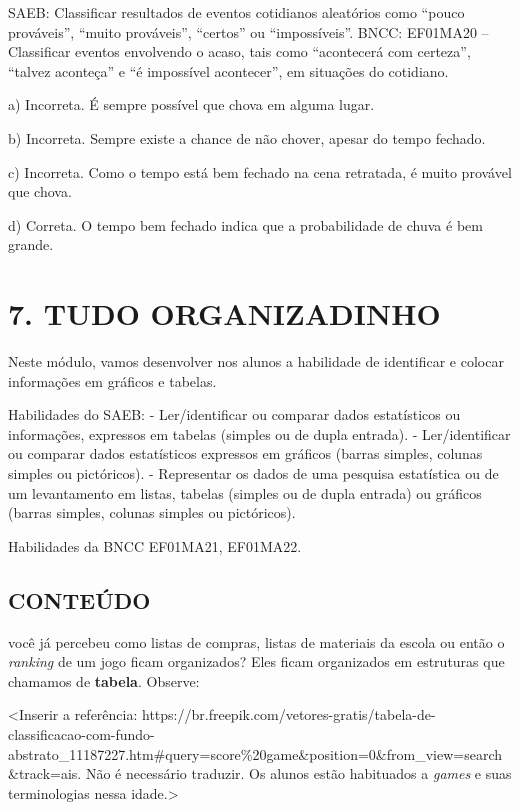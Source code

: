 SAEB: Classificar
resultados de eventos cotidianos aleatórios como ``pouco prováveis'',
``muito prováveis'', ``certos'' ou ``impossíveis''.
BNCC: EF01MA20 -- Classificar eventos envolvendo o acaso, tais como
``acontecerá com certeza'', ``talvez aconteça'' e ``é impossível
acontecer'', em situações do cotidiano.

a) Incorreta. É sempre possível que chova em alguma lugar.

b) Incorreta. Sempre existe a chance de não chover, apesar do tempo fechado.

c) Incorreta. Como o tempo está bem fechado na cena retratada, é muito provável que chova.

d) Correta. O tempo bem fechado indica que a probabilidade de chuva é bem grande.

\section{7. TUDO
ORGANIZADINHO}\label{muxf3dulo-7-tudo-organizadinho}

Neste módulo, vamos desenvolver nos alunos a habilidade de identificar e
colocar informações em gráficos e tabelas.

Habilidades do SAEB:
- Ler/identificar ou comparar dados estatísticos ou informações,
expressos em tabelas (simples ou de dupla entrada).
- Ler/identificar ou comparar dados estatísticos expressos em gráficos
(barras simples, colunas simples ou pictóricos).
- Representar os dados de uma pesquisa estatística ou de um levantamento
em listas, tabelas (simples ou de dupla entrada) ou gráficos (barras
simples, colunas simples ou pictóricos).

Habilidades da BNCC
EF01MA21, EF01MA22.

\subsection{CONTEÚDO}\label{conteuxfado-6}

você já percebeu como listas
de compras, listas de materiais da escola ou então o
\emph{ranking} de um jogo ficam organizados? Eles ficam organizados em estruturas que chamamos de \textbf{tabela}. Observe:

\textless{}Inserir a referência:
https://br.freepik.com/vetores-gratis/tabela-de-classificacao-com-fundo-abstrato\_11187227.htm\#query=score\%20game\&position=0\&from\_view=search\&track=ais.
Não é necessário traduzir. Os alunos estão habituados a \emph{games} e
suas terminologias nessa idade.\textgreater{}

